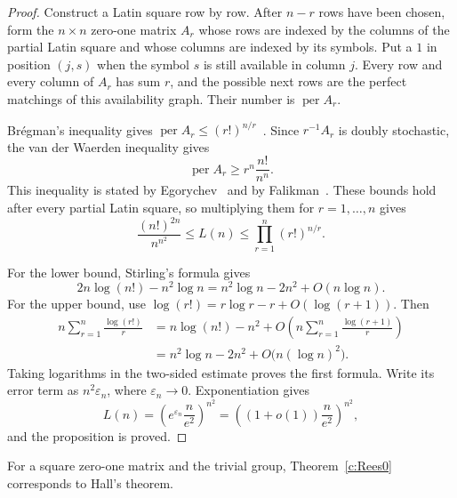 \documentclass[11pt]{article}
\theoremstyle{plain}
\theoremstyle{remark}
\theoremstyle{definition}
\theoremstyle{plain}
\begin{document}
\begin{proof}
Construct a Latin square row by row. After $n-r$ rows have been chosen, form
the $n\times n$ zero-one matrix $A_r$ whose rows are indexed by the columns
of the partial Latin square and whose columns are indexed by its symbols. Put
a $1$ in position $(j,s)$ when the symbol $s$ is still available in column
$j$. Every row and every column of $A_r$ has sum $r$, and the possible next
rows are the perfect matchings of this availability graph. Their number is
$\operatorname{per}A_r$.

Br\'egman's inequality gives
$\operatorname{per}A_r\le (r!)^{n/r}$~\cite[Theorem~4]{Bregman}. Since
$r^{-1}A_r$ is doubly stochastic, the van der Waerden inequality gives
\[
        \operatorname{per}A_r\ge r^n\frac{n!}{n^n}.
\]
This inequality is stated by Egorychev~\cite[p.~299]{Egorychev} and by
Falikman~\cite[Theorem~1]{Falikman}. These bounds hold after every partial
Latin square, so multiplying them for $r=1,\ldots,n$ gives
\[
        \frac{(n!)^{2n}}{n^{n^2}}
        \le L(n)
        \le \prod_{r=1}^n(r!)^{n/r}.
\]

For the lower bound, Stirling's formula gives
\[
        2n\log(n!)-n^2\log n
        =n^2\log n-2n^2+O(n\log n).
\]
For the upper bound, use
$\log(r!)=r\log r-r+O(\log(r+1))$. Then
\[
\begin{aligned}
        n\sum_{r=1}^n\frac{\log(r!)}r
        &=n\log(n!)-n^2
          +O\left(n\sum_{r=1}^n\frac{\log(r+1)}r\right)\\
        &=n^2\log n-2n^2+O\bigl(n(\log n)^2\bigr).
\end{aligned}
\]
Taking logarithms in the two-sided estimate proves the first formula.
Write its error term as $n^2\varepsilon_n$, where $\varepsilon_n\to0$.
Exponentiation gives
\[
        L(n)=\left(e^{\varepsilon_n}\frac{n}{e^2}\right)^{n^2}
             =\left((1+o(1))\frac{n}{e^2}\right)^{n^2},
\]
and the proposition is proved.
\end{proof}

For a square zero-one matrix and the trivial group, Theorem~\ref{c:Rees0}
corresponds to Hall's theorem.
\end{document}
